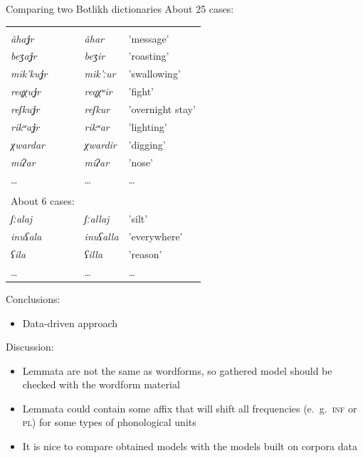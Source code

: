 \documentclass[13pt, t]{beamer}
\begin{document}
\begin{frame}{Comparing two Botlikh dictionaries}
About 25 cases:\\

\begin{tabular}{lll}
\citep{alekseev2019} &\citep{saidovaabusov2012} & \\
\textit{ãha\textbf{\underline{j}}r}   & \textit{ãhar}   & 'message’        \\
\textit{beʒa\textbf{\underline{j}}r}   & \textit{beʒir}   & 'roasting’       \\
\textit{mik'ku\textbf{\underline{j}}r} & \textit{mik'ːur} & 'swallowing’     \\
\textit{reqχu\textbf{\underline{j}}r}  & \textit{reqχʷir} & 'fight’          \\
\textit{reʃku\textbf{\underline{j}}r}  & \textit{reʃkur}  & 'overnight stay’ \\
\textit{rikʷa\textbf{\underline{j}}r}  & \textit{rikʷar} & 'lighting’     \\ \hline
\textit{χwardar} & \textit{χwardir} & 'digging' \\
\textit{miʔar} & \textit{miʔar} & 'nose'\\ 
\dots & \dots & \dots \\ 
& & \\
About 6 cases: & & \\
\textit{ʃːalaj} & \textit{ʃːallaj} & 'silt' \\
\textit{inuʕala} & \textit{inuʕalla} & 'everywhere' \\
\textit{ʕila} & \textit{ʕilla} & 'reason' \\
\dots & \dots & \dots \\
\end{tabular}

\end{frame}

\begin{frame}
\begin{block}{Conclusions:}
\begin{itemize}
\item Data-driven approach
\end{itemize}
\end{block}
\begin{block}{Discussion:}
\begin{itemize}
\item Lemmata are not the same as wordforms, so gathered model should be checked with the wordform material
\item Lemmata could contain some affix that will shift all frequencies (e.~g.~\textsc{inf} or \textsc{pl}) for some types of phonological units
\item It is nice to compare obtained models with the models built on corpora data
\end{itemize}
\end{block}
\end{frame}
\end{document}
